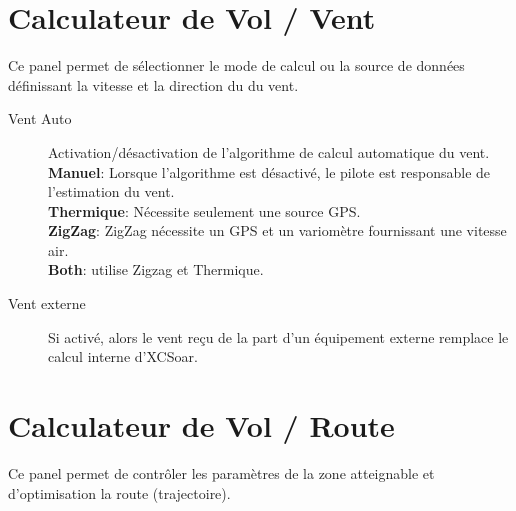 \section{Calculateur de Vol / Vent} \label{sec:wind}

Ce panel permet de sélectionner le mode de calcul ou la source de données définissant la vitesse et la direction du du vent.

\begin{description}
\item[Vent Auto]  \label{conf:autowind} Activation/désactivation de l'algorithme de calcul automatique du vent.\\
  {\bf Manuel}: Lorsque l'algorithme est désactivé, le pilote est responsable de l'estimation du vent. \\
  {\bf Thermique}: Nécessite seulement une source GPS. \\
  {\bf ZigZag}: ZigZag nécessite un GPS et un variomètre fournissant une vitesse air. \\
  {\bf Both}:  utilise Zigzag et Thermique.
\item[Vent externe]  Si activé, alors le vent reçu de la part d'un  équipement externe remplace le calcul interne d'XCSoar.
\end{description}


\section{Calculateur de Vol / Route}

Ce panel permet de contrôler les paramètres de la zone atteignable et d'optimisation la route (trajectoire).

